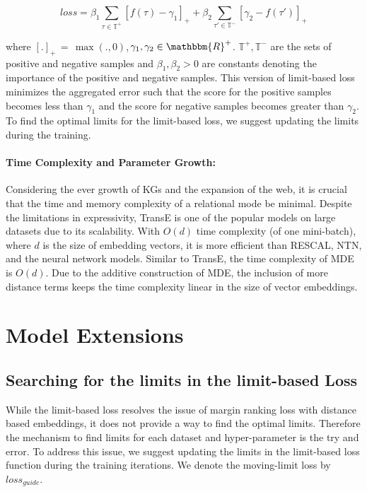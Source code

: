 \documentclass{ecai}
\begin{document}
\begin{equation}\label{eq:6}
loss =  \beta_1 \sum_{\tau\in \mathds{T}^+} [f(\tau)- \gamma_1]_+ + \beta_2 \sum_{\tau'\in \mathds{T}^-} [\gamma_2 - f(\tau')]_+ 
\end{equation}

where $[.]_+\, =\, \max(., 0)$,\,$\gamma_1, \gamma_2 \in \mathbbm{R}^+$. $\mathds{T}^+ ,\mathds{T}^-$ are the sets of positive and negative samples and $\beta_1, \beta_2 >0$ are constants denoting the importance of the positive and negative samples. This version of limit-based loss minimizes the aggregated error such that the score for the positive samples becomes less than $\gamma_1$ and the score for negative samples becomes greater than $\gamma_2$. To find the optimal limits for the limit-based loss, we suggest updating the limits during the training.

\paragraph*{Time Complexity and Parameter Growth:}
Considering the ever growth of KGs and the expansion of the web, it is crucial that the time and memory complexity of a relational mode be minimal. Despite the limitations in expressivity, TransE is one of the popular models on large datasets due to its scalability. With $O(d)$ time complexity (of one mini-batch), where $d$ is the size of embedding vectors, it is more efficient than RESCAL, NTN, and the neural network models. 
Similar to TransE, the time complexity of MDE is $O(d)$. Due to the additive construction of MDE, the inclusion of more distance terms keeps the time complexity linear in the size of vector embeddings.


\section{Model Extensions}\label{sec:extensions}
\subsection{Searching for the limits in the limit-based Loss}
While the limit-based loss resolves the issue of margin ranking loss with distance based embeddings, it does not provide a way to find the optimal limits. Therefore the mechanism to find limits for each dataset and hyper-parameter is the try and error. To address this issue, we suggest updating the limits in the limit-based loss function during the training iterations. We denote the moving-limit loss by $loss_{guide}$.
\end{document}
